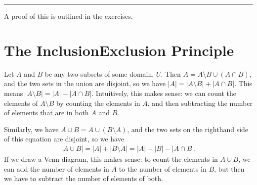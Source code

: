 \documentclass[letterpaper,10pt,english]{sphinxmanual}
\begin{document}
\bigskip\hrule\bigskip


\sphinxAtStartPar
A proof of this is outlined in the exercises.


\section{The Inclusion\sphinxhyphen{}Exclusion Principle}
\label{\detokenize{combinatorics:the-inclusion-exclusion-principle}}
\sphinxAtStartPar
Let \(A\) and \(B\) be any two subsets of some domain, \(U\). Then \(A = A \setminus B \cup (A \cap B)\), and the two sets in the union are disjoint, so we have \(|A| = |A \setminus B| + |A \cap B|\). This means \(|A \setminus B| = |A| - |A \cap B|\). Intuitively, this makes sense: we can count the elements of \(A \setminus B\) by counting the elements in \(A\), and then subtracting the number of elements that are in both \(A\) and \(B\).

\sphinxAtStartPar
Similarly, we have \(A \cup B = A \cup (B \setminus A)\), and the two sets on the right\sphinxhyphen{}hand side of this equation are disjoint, so we
have
\begin{equation*}
\begin{split}|A \cup B| = |A| + |B \setminus A| = |A| + |B| - |A \cap B|.\end{split}
\end{equation*}
\sphinxAtStartPar
If we draw a Venn diagram, this makes sense: to count the elements in \(A \cup B\), we can add the number of elements in \(A\) to the number of elements in \(B\), but then we have to subtract the number of elements of both.
\end{document}
